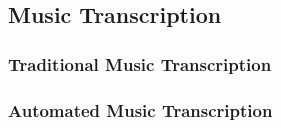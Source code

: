 \subsection{Music Transcription}
\subsubsection{Traditional Music Transcription}
\subsubsection{Automated Music Transcription}